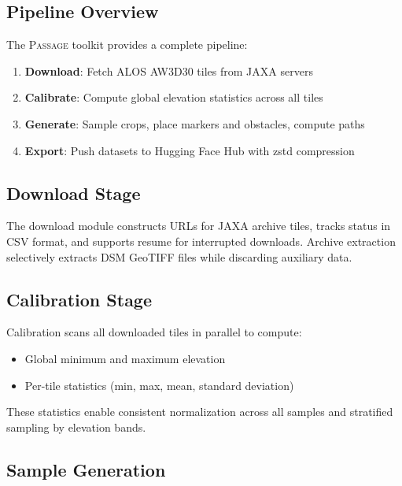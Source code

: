\documentclass{article}
\newcommand{\dataset}{\textsc{Passage}}
\begin{document}
\subsection{Pipeline Overview}

The \dataset{} toolkit provides a complete pipeline:

\begin{enumerate}[noitemsep]
    \item \textbf{Download}: Fetch ALOS AW3D30 tiles from JAXA servers
    \item \textbf{Calibrate}: Compute global elevation statistics across all tiles
    \item \textbf{Generate}: Sample crops, place markers and obstacles, compute paths
    \item \textbf{Export}: Push datasets to Hugging Face Hub with zstd compression
\end{enumerate}

\subsection{Download Stage}

The download module constructs URLs for JAXA archive tiles, tracks status in CSV format, and supports resume for interrupted downloads. Archive extraction selectively extracts DSM GeoTIFF files while discarding auxiliary data.

\subsection{Calibration Stage}

Calibration scans all downloaded tiles in parallel to compute:
\begin{itemize}[noitemsep]
    \item Global minimum and maximum elevation
    \item Per-tile statistics (min, max, mean, standard deviation)
\end{itemize}

These statistics enable consistent normalization across all samples and stratified sampling by elevation bands.

\subsection{Sample Generation}
\end{document}
